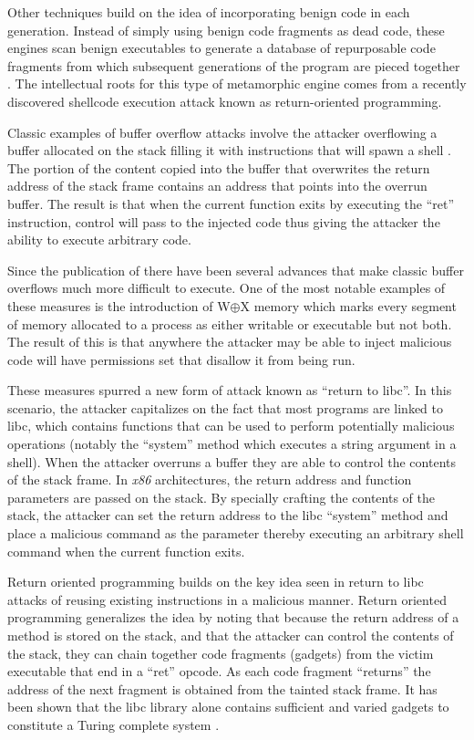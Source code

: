     Other techniques build on the idea of incorporating benign code in each
    generation. Instead of simply using benign code fragments as dead code,
    these engines scan benign executables to generate a database of repurposable
    code fragments from which subsequent generations of the program are pieced
    together \cite{franken}. The intellectual roots for this type of metamorphic
    engine comes from a recently discovered shellcode execution attack known as
    return-oriented programming.

    Classic examples of buffer overflow attacks involve the attacker overflowing
    a buffer allocated on the stack filling it with instructions that will spawn
    a shell \cite{aleph}. The portion of the content copied into the buffer that
    overwrites the return address of the stack frame contains an address that
    points into the overrun buffer. The result is that when the current function
    exits by executing the ``ret'' instruction, control will pass to the
    injected code thus giving the attacker the ability to execute arbitrary
    code.

    Since the publication of \cite{aleph} there have been several advances that
    make classic buffer overflows much more difficult to execute. One of the
    most notable examples of these measures is the introduction of W$\oplus$X
    memory which marks every segment of memory allocated to a process as either
    writable or executable but not both. The result of this is that anywhere the
    attacker may be able to inject malicious code will have permissions set that
    disallow it from being run.

    These measures spurred a new form of attack known as ``return to libc''. In
    this scenario, the attacker capitalizes on the fact that most programs are
    linked to libc, which contains functions that can be used to perform
    potentially malicious operations (notably the ``system'' method which
    executes a string argument in a shell). When the attacker overruns a buffer
    they are able to control the contents of the stack frame. In \emph{x86}
    architectures, the return address and function parameters are passed on the
    stack. By specially crafting the contents of the stack, the attacker can set
    the return address to the libc ``system'' method and place a malicious
    command as the parameter thereby executing an arbitrary shell command when
    the current function exits.

    Return oriented programming builds on the key idea seen in return to libc
    attacks of reusing existing instructions in a malicious manner. Return
    oriented programming generalizes the idea by noting that because the return
    address of a method is stored on the stack, and that the attacker can
    control the contents of the stack, they can chain together code fragments
    (gadgets) from the victim executable that end in a ``ret'' opcode. As each
    code fragment ``returns'' the address of the next fragment is obtained from
    the tainted stack frame. It has been shown that the libc library alone
    contains sufficient and varied gadgets to constitute a Turing complete
    system \cite{rop_geo}.

